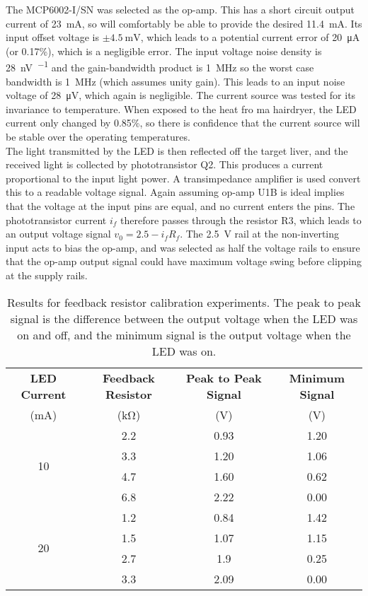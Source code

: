 The MCP6002-I/SN \cite{mcp6002} was selected as the op-amp. This has a short circuit output current of \SI{23}{\milli\ampere}, so will comfortably be able to provide the desired \SI{11.4}{\milli\ampere}. Its input offset voltage is $\pm\SI{4.5}{\milli\volt}$, which leads to a potential current error of \SI{20}{\micro\ampere} (or 0.17\%), which is a negligible error. The input voltage noise density is \SI{28}{\nano\volt\per\sqrt{\hertz}} and the gain-bandwidth product is \SI{1}{\mega\hertz} so the worst case bandwidth is \SI{1}{\mega\hertz} (which assumes unity gain). This leads to an input noise voltage of \SI{28}{\micro\volt}, which again is negligible. The current source was tested for its invariance to temperature. When exposed to the heat fro ma hairdryer, the LED current only changed by 0.85\%, so there is confidence that the current source will be stable over the operating temperatures.\\

The light transmitted by the LED is then reflected off the target liver, and the received light is collected by phototransistor Q2. This produces a current proportional to the input light power. A transimpedance amplifier is used convert this to a readable voltage signal. Again assuming op-amp U1B is ideal implies that the voltage at the input pins are equal, and no current enters the pins. The phototransistor current $i_f$ therefore passes through the resistor R3, which leads to an output voltage signal $v_0 = 2.5 - i_fR_f$. The \SI{2.5}{\volt} rail at the non-inverting input acts to bias the op-amp, and was selected as half the voltage rails to ensure that the op-amp output signal could have maximum voltage swing before clipping at the supply rails.\\

\begin{table}[htbp]
	\centering
	\caption{Results for feedback resistor calibration experiments. The peak to peak signal is the difference between the output voltage when the LED was on and off, and the minimum signal is the output voltage when the LED was on.}
	\label{tab: tia feedback resistor}
	\begin{tabular}{|c|c|c|c|}
		\hline
		\textbf{LED Current} & \textbf{Feedback Resistor} & \textbf{Peak to Peak Signal} & \textbf{Minimum Signal}\\
		(mA)	&	(\si{\kilo\ohm})	&	(V)	&	(V)\\
		\hline
		\multirow{4}{*}{10}	&	2.2	&	0.93	&	1.20\\
						\cline{2-4}
						&	3.3	&	1.20	&	1.06\\
						\cline{2-4}
						&	4.7	&	1.60	&	0.62\\
						\cline{2-4}
						&	6.8	&	2.22	&	0.00\\
		\hline
		\multirow{4}{*}{20}	&	1.2	&	0.84	&	1.42\\
						\cline{2-4}
						&	1.5	&	1.07	&	1.15\\
						\cline{2-4}
						&	2.7	&	1.9	&	0.25\\
						\cline{2-4}
						&	3.3	&	2.09	&	0.00\\
		\hline
	\end{tabular}
\end{table}

